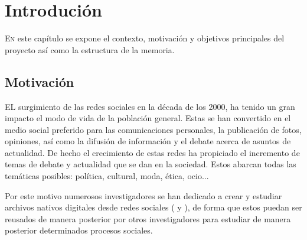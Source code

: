 \chapter{Introdución}
\label{chap:introducion}
\lettrine{E}{n} este capítulo se expone el contexto, motivación y objetivos principales del proyecto así como la estructura de la memoria.
\section{Motivación}

EL surgimiento de las redes sociales en la década de los 2000, ha tenido un gran impacto el modo de vida de la población general. Estas se han convertido en el medio social preferido para las comunicaciones personales, la publicación de fotos, opiniones, así como la difusión de información y el debate acerca de asuntos de actualidad. De hecho el crecimiento de estas redes ha propiciado el incremento de temas de debate y actualidad que se dan en la sociedad. Estos abarcan todas las temáticas posibles: política, cultural, moda, ética, ocio...

Por este motivo numerosos investigadores se han dedicado a crear y estudiar archivos nativos digitales desde redes sociales (\cite{acker_2014} y \cite{pybus_2013}), de forma que estos puedan ser reusados de manera posterior por otros investigadores para estudiar de manera posterior determinados procesos sociales.

